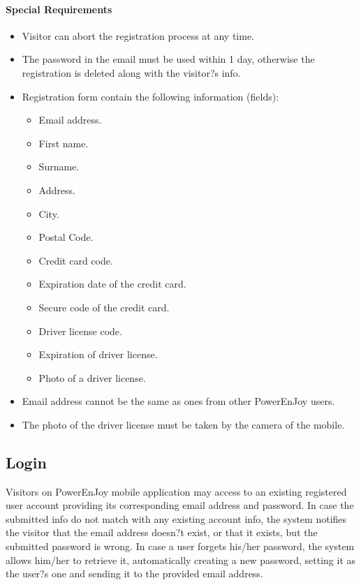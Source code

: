 \paragraph{Special Requirements}
\begin{itemize}
	\item Visitor can abort the registration process at any time.
	\item The password in the email must be used within 1 day, otherwise the registration is deleted along with the visitor?s info.
	\item Registration form contain the following information (fields):
	\begin{itemize}
		\item Email address.
		\item First name.
		\item Surname.
		\item Address.
		\item City.
		\item Postal Code.
		\item Credit card code.
		\item Expiration date of the credit card.
		\item Secure code of the credit card.
		\item Driver license code.
		\item Expiration of driver license.
		\item Photo of a driver license.
	\end{itemize}
	\item Email address cannot be the same as ones from other PowerEnJoy users.
	\item The photo of the driver license must be taken by the camera of the mobile.
\end{itemize}

\subsection{Login}
Visitors on PowerEnJoy mobile application may access to an existing registered user account providing its corresponding email address and password. In case the submitted info do not match with any existing account info, the system notifies the visitor that the email address doesn?t exist, or that it exists, but the submitted password is wrong. In case a user forgets his/her password, the system allows him/her to retrieve it, automatically creating a new password, setting it as the user?s one and sending it to the provided email address.
